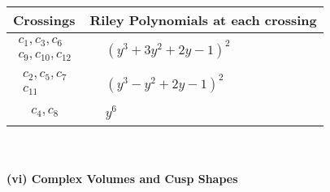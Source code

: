\documentclass[1p]{elsarticle_modified}
\theoremstyle{definition}
\begin{document}
\begin{tabular}{m{50pt}|m{274pt}}
Crossings & \hspace{64pt}Riley Polynomials at each crossing \\
\hline $$\begin{aligned}c_{1},c_{3},c_{6}\\c_{9},c_{10},c_{12}\end{aligned}$$&$\begin{aligned}
&(y^3+3 y^2+2 y-1)^2
\end{aligned}$\\
\hline $$\begin{aligned}c_{2},c_{5},c_{7}\\c_{11}\end{aligned}$$&$\begin{aligned}
&(y^3- y^2+2 y-1)^2
\end{aligned}$\\
\hline $$\begin{aligned}c_{4},c_{8}\end{aligned}$$&$\begin{aligned}
&y^6
\end{aligned}$\\
\hline
\end{tabular}\\~\\
\newpage\flushleft \textbf{(vi) Complex Volumes and Cusp Shapes}
\end{document}
